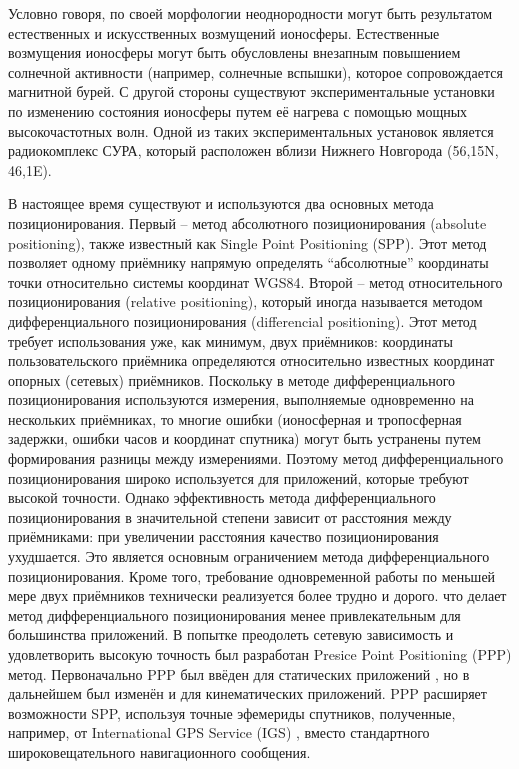 Условно говоря, по своей морфологии неоднородности могут быть результатом естественных и искусственных возмущений ионосферы.
Естественные возмущения ионосферы могут быть обусловлены внезапным повышением солнечной активности (например, солнечные вспышки), которое сопровождается магнитной бурей.  
С другой стороны существуют экспериментальные установки по изменению состояния ионосферы путем её нагрева с помощью мощных высокочастотных волн. 
Одной из таких экспериментальных установок является радиокомплекс СУРА, который расположен вблизи Нижнего Новгорода (56,15\degree N, 46,1\degree E).

В настоящее время существуют и используются два основных метода позиционирования.
Первый -- метод абсолютного позиционирования (absolute positioning), также известный как Single Point Positioning (SPP).
Этот метод позволяет одному приёмнику напрямую определять ``абсолютные'' координаты точки относительно системы координат WGS84.
Второй -- метод относительного позиционирования (relative positioning), который иногда называется методом дифференциального позиционирования (differencial positioning). 
Этот метод требует использования уже, как минимум, двух приёмников: координаты пользовательского приёмника определяются относительно известных координат опорных (сетевых) приёмников. 
Поскольку в методе дифференциального позиционирования используются измерения, выполняемые одновременно на нескольких приёмниках, то многие ошибки (ионосферная и тропосферная задержки, ошибки часов и координат спутника) могут быть устранены путем формирования разницы между измерениями. 
Поэтому метод дифференциального позиционирования широко используется для приложений, которые требуют высокой точности.
Однако эффективность метода дифференциального позиционирования в значительной степени зависит от расстояния между приёмниками: при увеличении расстояния качество позиционирования ухудшается.
Это является основным ограничением метода дифференциального позиционирования. 
Кроме того, требование одновременной работы по меньшей мере двух приёмников технически реализуется более трудно и дорого. что делает метод дифференциального позиционирования менее привлекательным для большинства приложений.
В попытке преодолеть сетевую зависимость и удовлетворить высокую точность был разработан Presice Point Positioning (PPP) метод.
Первоначально PPP был ввёден для статических приложений \cite{Zumberge1997}, но в дальнейшем был изменён и для кинематических приложений.
PPP расширяет возможности SPP, используя точные эфемериды спутников, полученные, например, от International GPS Service (IGS) \cite{Dow2009}, вместо стандартного широковещательного навигационного сообщения.

